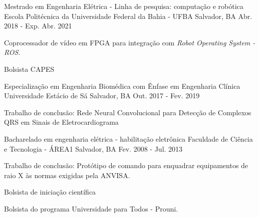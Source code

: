 

\begin{cventries}

  \cventry
    {Mestrado em Engenharia Elétrica - Linha de pesquisa: computação e robótica} %
    {Escola Politécnica da Universidade Federal da Bahia - UFBA} %
    {Salvador, BA} %
    {Abr. 2018 - Exp. Abr. 2021} %
    {
      \begin{cvitems} %
        \item {Coprocessador de vídeo em FPGA para integração com \textit{Robot Operating System - ROS}.}
        \item {Bolsista CAPES}
      \end{cvitems}
    }


  \cventry
    {Especialização em Engenharia Biomédica com Ênfase em Engenharia Clínica} %
    {Universidade Estácio de Sá} %
    {Salvador, BA} %
    {Out. 2017 - Fev. 2019} %
    {
      \begin{cvitems} %
        \item {Trabalho de conclusão: Rede Neural Convolucional para Detecção de Complexos QRS em Sinais de Eletrocardiograma}
      \end{cvitems}
    }


  \cventry
    {Bacharelado em engenharia elétrica - habilitação eletrônica} %
    {Faculdade de Ciência e Tecnologia - ÁREA1} %
    {Salvador, BA} %
    {Fev. 2008 - Jul. 2013} %
    {
      \begin{cvitems} %
        \item {Trabalho de conclusão: Protótipo de comando para enquadrar equipamentos de raio X às normas exigidas pela ANVISA.}
        \item {Bolsista de iniciação científica}
        \item {Bolsista do programa Universidade para Todos - Prouni.}
      \end{cvitems}
    }


\end{cventries}
